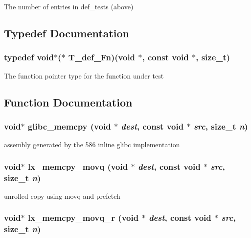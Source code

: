 The number of entries in def\_\-tests (above) 

\subsection{Typedef Documentation}
\subsubsection{\setlength{\rightskip}{0pt plus 5cm}typedef void$\ast$($\ast$ {\bf T\_\-def\_\-Fn})(void $\ast$, const void $\ast$, size\_\-t)}\label{memcpy_2def__test_8h_a3}


The function pointer type for the function under test 

\subsection{Function Documentation}
\subsubsection{\setlength{\rightskip}{0pt plus 5cm}void$\ast$ glibc\_\-memcpy (void $\ast$ {\em dest}, const void $\ast$ {\em src}, size\_\-t {\em n})}\label{memcpy_2def__test_8h_a5}


assembly generated by the 586 inline glibc implementation 
\subsubsection{\setlength{\rightskip}{0pt plus 5cm}void$\ast$ lx\_\-memcpy\_\-movq (void $\ast$ {\em dest}, const void $\ast$ {\em src}, size\_\-t {\em n})}\label{memcpy_2def__test_8h_a6}


unrolled copy using movq and prefetch 
\subsubsection{\setlength{\rightskip}{0pt plus 5cm}void$\ast$ lx\_\-memcpy\_\-movq\_\-r (void $\ast$ {\em dest}, const void $\ast$ {\em src}, size\_\-t {\em n})}\label{memcpy_2def__test_8h_a7}


